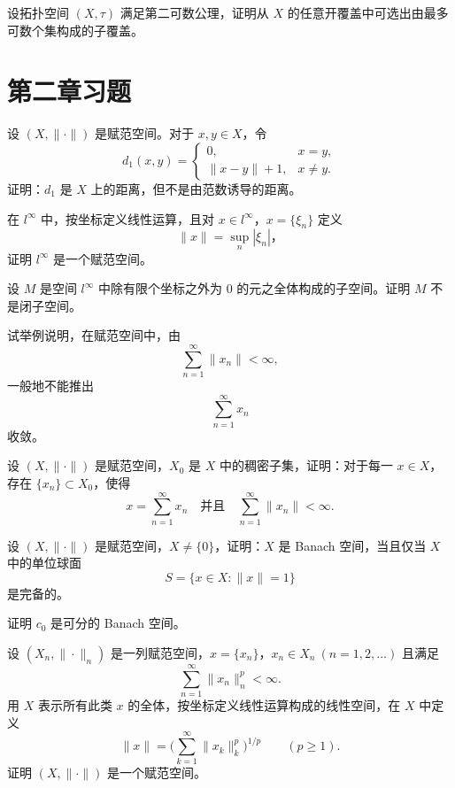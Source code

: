 \begin{homework}[1.25]
设拓扑空间 $(X,\tau)$ 满足第二可数公理，证明从 $X$ 的任意开覆盖中可选出由最多可数个集构成的子覆盖。
\end{homework}
\section{第二章习题}
\begin{homework}[2.1]
设 $(X,\|\cdot\|)$ 是赋范空间。对于 $x,y\in X$，令
\[
d_1(x,y)=
\begin{cases}
0, & x=y,\\[4pt]
\|x-y\|+1, & x\ne y.
\end{cases}
\]
证明：$d_1$ 是 $X$ 上的距离，但不是由范数诱导的距离。
\end{homework}

\begin{homework}[2.2]
在 $l^\infty$ 中，按坐标定义线性运算，且对 $x\in l^\infty$，$x=\{\xi_n\}$ 定义
\[
\|x\|=\sup_n |\xi_n|，
\]
证明 $l^\infty$ 是一个赋范空间。
\end{homework}

\begin{homework}[2.3]
设 $M$ 是空间 $l^\infty$ 中除有限个坐标之外为 $0$ 的元之全体构成的子空间。证明 $M$ 不是闭子空间。
\end{homework}

\begin{homework}[2.4]
试举例说明，在赋范空间中，由
\[
\sum_{n=1}^{\infty} \|x_n\| < \infty,
\]
一般地不能推出
\[
\sum_{n=1}^{\infty} x_n
\]
收敛。
\end{homework}

\begin{homework}[2.5]
设 $(X,\|\cdot\|)$ 是赋范空间，$X_0$ 是 $X$ 中的稠密子集，证明：对于每一 $x\in X$，存在 $\{x_n\}\subset X_0$，使得
\[
x = \sum_{n=1}^{\infty} x_n
\quad\text{并且}\quad
\sum_{n=1}^{\infty} \|x_n\| < \infty.
\]
\end{homework}

\begin{homework}[2.6]
设 $(X,\|\cdot\|)$ 是赋范空间，$X\ne\{0\}$，证明：$X$ 是 Banach 空间，当且仅当 $X$ 中的单位球面
\[
S=\{x\in X:\|x\|=1\}
\]
是完备的。
\end{homework}
\begin{homework}[2.7]
证明 $c_0$ 是可分的 Banach 空间。
\end{homework}

\begin{homework}[2.8]
设 $(X_n,\|\cdot\|_n)$ 是一列赋范空间，$x=\{x_n\}$，$x_n\in X_n\ (n=1,2,\dots)$ 且满足
\[
\sum_{n=1}^{\infty}\|x_n\|_n^p<\infty.
\]
用 $X$ 表示所有此类 $x$ 的全体，按坐标定义线性运算构成的线性空间，在 $X$ 中定义
\[
\|x\|=\Biggl(\sum_{k=1}^{\infty}\|x_k\|_k^p\Biggr)^{1/p}\qquad (p\ge1).
\]
证明 $(X,\|\cdot\|)$ 是一个赋范空间。
\end{homework}

